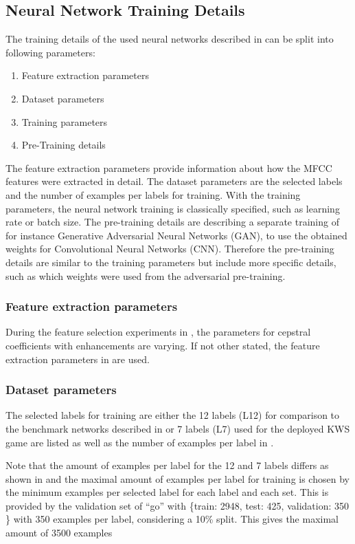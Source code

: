 
\subsection{Neural Network Training Details}\label{sec:exp_details_training}
The training details of the used neural networks described in  can be split into following parameters:
\begin{enumerate}
  \item Feature extraction parameters
  \item Dataset parameters
  \item Training parameters
  \item Pre-Training details
\end{enumerate}
The feature extraction parameters provide information about how the MFCC features were extracted in detail.
The dataset parameters are the selected labels and the number of examples per labels for training.
With the training parameters, the neural network training is classically specified, such as learning rate or batch size.
The pre-training details are describing a separate training of for instance Generative Adversarial Neural Networks (GAN), to use the obtained weights for Convolutional Neural Networks (CNN).
Therefore the pre-training details are similar to the training parameters but include more specific details, such as which weights were used from the adversarial pre-training.



\subsubsection{Feature extraction parameters}
During the feature selection experiments in , the parameters for cepstral coefficients with enhancements are varying.
If not other stated, the feature extraction parameters in  are used.




\subsubsection{Dataset parameters}
The selected labels for training are either the 12 labels (L12) for comparison to the benchmark networks described in  or 7 labels (L7) used for the deployed KWS game are listed as well as the number of examples per label in .

Note that the amount of examples per label for the 12 and 7 labels differs as shown in  and the maximal amount of examples per label for training is chosen by the minimum examples per selected label for each label and each set.
This is provided by the validation set of \enquote{go} with \{train: 2948, test: 425, validation: 350 \} with 350 examples per label, considering a 10\% split.
This gives the maximal amount of 3500 examples



